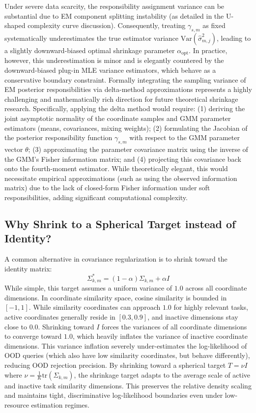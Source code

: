 \documentclass{article}
\theoremstyle{plain}
\theoremstyle{definition}
\theoremstyle{remark}
\begin{document}
Under severe data scarcity, the responsibility assignment variance can be substantial due to EM component splitting instability (as detailed in the U-shaped complexity curve discussion). Consequently, treating $\gamma_{s, m}$ as fixed systematically underestimates the true estimator variance $\text{Var}(\hat{\sigma}^2_{m, j})$, leading to a slightly downward-biased optimal shrinkage parameter $\alpha_{\text{opt}}$. In practice, however, this underestimation is minor and is elegantly countered by the downward-biased plug-in MLE variance estimators, which behave as a conservative boundary constraint. Formally integrating the sampling variance of EM posterior responsibilities via delta-method approximations represents a highly challenging and mathematically rich direction for future theoretical shrinkage research. Specifically, applying the delta method would require: (1) deriving the joint asymptotic normality of the coordinate samples and GMM parameter estimators (means, covariances, mixing weights); (2) formulating the Jacobian of the posterior responsibility function $\gamma_{s, m}$ with respect to the GMM parameter vector $\theta$; (3) approximating the parameter covariance matrix using the inverse of the GMM's Fisher information matrix; and (4) projecting this covariance back onto the fourth-moment estimator. While theoretically elegant, this would necessitate empirical approximations (such as using the observed information matrix) due to the lack of closed-form Fisher information under soft responsibilities, adding significant computational complexity.

\subsection{Why Shrink to a Spherical Target instead of Identity?}
A common alternative in covariance regularization is to shrink toward the identity matrix:
\begin{equation}
    \Sigma^{*}_{k, m} = (1 - \alpha) \Sigma_{k, m} + \alpha I
\end{equation}
While simple, this target assumes a uniform variance of $1.0$ across all coordinate dimensions. In coordinate similarity space, cosine similarity is bounded in $[-1, 1]$. While similarity coordinates can approach $1.0$ for highly relevant tasks, active coordinates generally reside in $[0.3, 0.9]$, and inactive dimensions stay close to $0.0$. Shrinking toward $I$ forces the variances of all coordinate dimensions to converge toward $1.0$, which heavily inflates the variance of inactive coordinate dimensions. This variance inflation severely under-estimates the log-likelihood of OOD queries (which also have low similarity coordinates, but behave differently), reducing OOD rejection precision.
By shrinking toward a spherical target $T = \nu I$ where $\nu = \frac{1}{K} \text{tr}(\Sigma_{k, m})$, the shrinkage target adapts to the average scale of active and inactive task similarity dimensions. This preserves the relative density scaling and maintains tight, discriminative log-likelihood boundaries even under low-resource estimation regimes.
\end{document}
